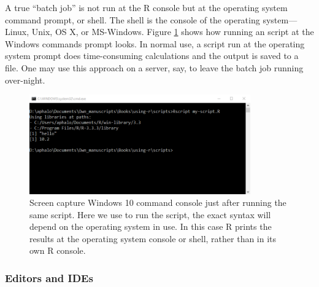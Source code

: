 \documentclass[krantz2,ChapterTOCs]{krantz}\usepackage{knitr}
\begin{document}
A true ``batch job'' is not run at the R console but at the operating system command prompt, or shell. The shell is the console of the operating system---Linux, Unix, OS X, or MS-Windows. Figure \ref{fig:intro:shell} shows how running an script at the Windows commands prompt looks. In normal use, a script run at the operating system prompt does time-consuming calculations and the output is saved to a file. One may use this approach on a server, say, to leave the batch job running over-night.

\begin{figure}
  \centering
  \includegraphics[width=0.85\textwidth]{figures/windows-cmd-script}
  \caption[Script at the Windows cmd promt]{Screen capture Windows 10 command console just after running the same script. Here we use  to run the script, the exact syntax will depend on the operating system in use. In this case R prints the results at the operating system console or shell, rather than in its own R console.}\label{fig:intro:shell}
\end{figure}

\subsubsection{Editors and IDEs}
\end{document}
